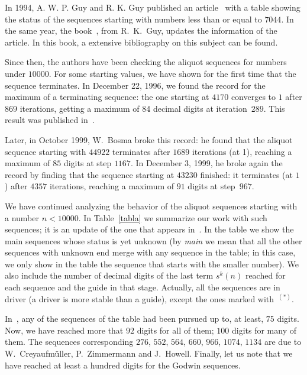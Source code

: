 \documentclass[11pt,twoside]{article}   %
\theoremstyle{plain}
\theoremstyle{definition}
\theoremstyle{remark}
\begin{document}
In 1994, A. W. P. Guy and R. K. Guy published an article~\cite{Guy-Guy} with a table showing
the status of the sequences starting with numbers less than or equal to $7044$. In the same
year, the book~\cite{Guy}, from R.~K.~Guy, updates the information of the article. In this
book, a extensive bibliography on this subject can be found.

Since then, the authors have been checking the aliquot sequences for numbers under $10000$.
For some starting values, we have shown for the first time that the sequence terminates. In
December 22, 1996, we found the record for the maximum of a terminating sequence:
the one starting at $4170$ converges to $1$ after $869$ iterations, getting a maximum
of 84 decimal digits at iteration~$289$. This result was published in~\cite{Ben-Var}.

Later, in October 1999, W.~Bosma broke this record: he found that the aliquot sequence
starting with $44922$ terminates after $1689$ iterations (at 1), reaching a maximum of
$85$ digits at step $1167$. In December 3, 1999, he broke again the record by finding
that the sequence starting at $43230$ finished: it terminates (at $1$) after
$4357$ iterations, reaching a maximum of $91$ digits at step~$967$.

We have continued analyzing the behavior of the aliquot sequences starting with a number
$n < 10000$. In Table~\ref{tabla} we summarize our work with such sequences; it is an update
of the one that appears in~\cite{Ben-Var}. In the table we show the main sequences whose
status is yet unknown (by \textit{main} we mean that all the other sequences with
unknown end merge with any sequence in the table; in this case, we only show
in the table the sequence that starts with the smaller number). We also include the
number of decimal digits of the last term $s^k(n)$ reached for each sequence
and the guide in that stage. Actually, all the sequences are in driver (a driver is more
stable than a guide), except the ones marked with~$^{(*)}$.

In~\cite{Ben-Var}, any of the sequences of the table had been pursued up to, at least, $75$
digits. Now, we have reached more that $92$ digits for all of them; $100$ digits for many of
them. The sequences corresponding $276$, $552$, $564$, $660$, $966$, $1074$, $1134$ are due
to W.~Creyaufm\"uller, P.~Zimmermann and J.~Howell.
Finally, let us note that we have reached at least a hundred digits for the Godwin
sequences.
\end{document}
